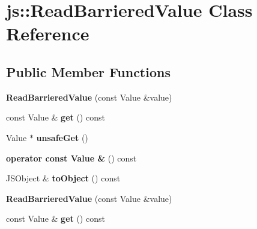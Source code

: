 \hypertarget{classjs_1_1_read_barriered_value}{\section{js\-:\-:Read\-Barriered\-Value Class Reference}
\label{classjs_1_1_read_barriered_value}
}
\subsection*{Public Member Functions}
\begin{DoxyCompactItemize}
\item 
\hypertarget{classjs_1_1_read_barriered_value_a1d40207fd6539e5dbc951f6c5a4d1005}{{\bfseries Read\-Barriered\-Value} (const Value \&value)}\label{classjs_1_1_read_barriered_value_a1d40207fd6539e5dbc951f6c5a4d1005}

\item 
\hypertarget{classjs_1_1_read_barriered_value_a7f5e89804816ec4ed0af5b1a3cb6f3e6}{const Value \& {\bfseries get} () const }\label{classjs_1_1_read_barriered_value_a7f5e89804816ec4ed0af5b1a3cb6f3e6}

\item 
\hypertarget{classjs_1_1_read_barriered_value_ab79f0c28324521f05ad34f818c1ab579}{Value $\ast$ {\bfseries unsafe\-Get} ()}\label{classjs_1_1_read_barriered_value_ab79f0c28324521f05ad34f818c1ab579}

\item 
\hypertarget{classjs_1_1_read_barriered_value_affa6a3c85a865eb0bdc8737a8067d235}{{\bfseries operator const Value \&} () const }\label{classjs_1_1_read_barriered_value_affa6a3c85a865eb0bdc8737a8067d235}

\item 
\hypertarget{classjs_1_1_read_barriered_value_aec9d8d7af5dbf168ea039b522aa45ef7}{J\-S\-Object \& {\bfseries to\-Object} () const }\label{classjs_1_1_read_barriered_value_aec9d8d7af5dbf168ea039b522aa45ef7}

\item 
\hypertarget{classjs_1_1_read_barriered_value_a1d40207fd6539e5dbc951f6c5a4d1005}{{\bfseries Read\-Barriered\-Value} (const Value \&value)}\label{classjs_1_1_read_barriered_value_a1d40207fd6539e5dbc951f6c5a4d1005}

\item 
\hypertarget{classjs_1_1_read_barriered_value_a7f5e89804816ec4ed0af5b1a3cb6f3e6}{const Value \& {\bfseries get} () const }\label{classjs_1_1_read_barriered_value_a7f5e89804816ec4ed0af5b1a3cb6f3e6}


\end{DoxyCompactItemize}
